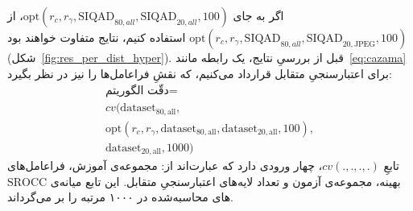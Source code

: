 \documentclass[twocolumn]{article}
\begin{document}
اگر به جای $\text{opt}(r_c, r_\gamma, \text{SIQAD}_{80, all}, \text{SIQAD}_{20, all}, 100)$، از $\text{opt}(r_c, r_\gamma, \text{SIQAD}_{80, all}, \text{SIQAD}_{20, \text{JPEG}}, 100)$ استفاده کنیم، نتایج متفاوت خواهند بود (شکل~\ref{fig:res_per_dist_hyper}). قبل از بررسیِ نتایج، یک رابطه مانند~\ref{eq:cazama} برای اعتبارسنجیِ متقابل قرارداد می‌کنیم، که نقشِ فراعامل‌ها را نیز در نظر بگیرد:
\begin{equation}
	\begin{aligned}
	\text{دقّت الگوریتم} = \\
		\displaystyle cv(\text{dataset}_{80, \text{all}}, \\
		\text{opt}(r_c, r_\gamma, \text{dataset}_{80, \text{all}}, \text{dataset}_{20, \text{all}}, 100),\\
		\text{dataset}_{20, \text{all}}, 1000)
	\end{aligned}
	\label{eq:parama}
\end{equation}
تابعِ $cv(.,.,.,.)$، چهار  ورودی دارد که عبارت‌اند از: مجموعه‌ی آموزش، فراعامل‌های بهینه، مجموعه‌ی آزمون و تعداد لایه‌های اعتبارسنجیِ متقابل. این تابع میانه‌ی $\text{SROCC}$های محاسبه‌شده در ۱۰۰۰ مرتبه را بر می‌گرداند.
\end{document}
